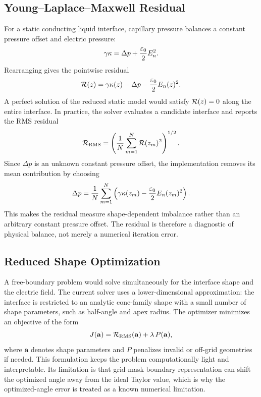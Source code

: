 \subsection{Young--Laplace--Maxwell Residual}

For a static conducting liquid interface, capillary pressure balances a constant pressure offset and electric pressure:
\begin{equation}
    \gamma\kappa = \Delta p + \frac{\varepsilon_0}{2}E_n^2.
\label{eq:ylm_balance_full}
\end{equation}
Rearranging gives the pointwise residual
\begin{equation}
    \mathcal{R}(z)=\gamma\kappa(z)-\Delta p-\frac{\varepsilon_0}{2}E_n(z)^2.
\label{eq:residual_full}
\end{equation}
A perfect solution of the reduced static model would satisfy $\mathcal{R}(z)=0$ along the entire interface. In practice, the solver evaluates a candidate interface and reports the RMS residual
\begin{equation}
    \mathcal{R}_{\mathrm{RMS}}
    =\left(\frac{1}{N}\sum_{m=1}^{N}\mathcal{R}(z_m)^2\right)^{1/2}.
\end{equation}
Since $\Delta p$ is an unknown constant pressure offset, the implementation removes its mean contribution by choosing
\begin{equation}
    \Delta p = \frac{1}{N}\sum_{m=1}^{N}\left(\gamma\kappa(z_m)-\frac{\varepsilon_0}{2}E_n(z_m)^2\right).
\end{equation}
This makes the residual measure shape-dependent imbalance rather than an arbitrary constant pressure offset. The residual is therefore a diagnostic of physical balance, not merely a numerical iteration error.

\subsection{Reduced Shape Optimization}

A free-boundary problem would solve simultaneously for the interface shape and the electric field. The current solver uses a lower-dimensional approximation: the interface is restricted to an analytic cone-family shape with a small number of shape parameters, such as half-angle and apex radius. The optimizer minimizes an objective of the form
\begin{equation}
    J(\mathbf{a})=\mathcal{R}_{\mathrm{RMS}}(\mathbf{a})+\lambda\,P(\mathbf{a}),
\end{equation}
where $\mathbf{a}$ denotes shape parameters and $P$ penalizes invalid or off-grid geometries if needed. This formulation keeps the problem computationally light and interpretable. Its limitation is that grid-mask boundary representation can shift the optimized angle away from the ideal Taylor value, which is why the optimized-angle error is treated as a known numerical limitation.

